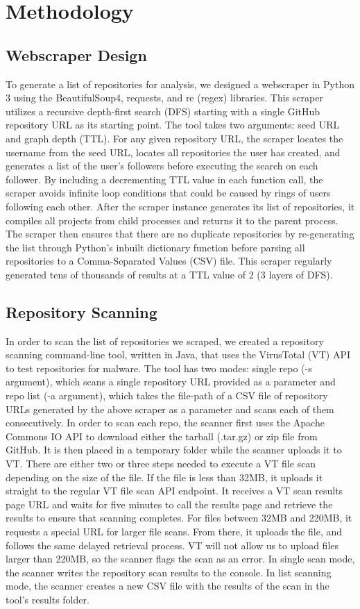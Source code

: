 \documentclass[]{acmart}
\begin{document}
\section{Methodology}
\subsection{Webscraper Design}
To generate a list of repositories for analysis, we designed a webscraper in Python 3 using the BeautifulSoup4, requests, and re (regex) libraries. This scraper utilizes a recursive depth-first search (DFS) starting with a single GitHub repository URL as its starting point. The tool takes two arguments: seed URL and graph depth (TTL). For any given repository URL, the scraper locates the username from the seed URL, locates all repositories the user has created, and generates a list of the user's followers before executing the search on each follower. By including a decrementing TTL value in each function call, the scraper avoids infinite loop conditions that could be caused by rings of users following each other. After the scraper instance generates its list of repositories, it compiles all projects from child processes and returns it to the parent process. The scraper then ensures that there are no duplicate repositories by re-generating the list through Python's inbuilt dictionary function before parsing all repositories to a Comma-Separated Values (CSV) file. This scraper regularly generated tens of thousands of results at a TTL value of 2 (3 layers of DFS).
\subsection{Repository Scanning}
In order to scan the list of repositories we scraped, we created a repository scanning command-line tool, written in Java, that uses the VirusTotal (VT) API to test repositories for malware. The tool has two modes: single repo (-s argument), which scans a single repository URL provided as a parameter and repo list (-a argument), which takes the file-path of a CSV file of repository URLs generated by the above scraper as a parameter and scans each of them consecutively. In order to scan each repo, the scanner first uses the Apache Commons IO API to download either the tarball (.tar.gz) or zip file from GitHub. It is then placed in a temporary folder while the scanner uploads it to VT. There are either two or three steps needed to execute a VT file scan depending on the size of the file. If the file is less than 32MB, it uploads it straight to the regular VT file scan API endpoint. It receives a VT scan results page URL and waits for five minutes to call the results page and retrieve the results to ensure that scanning completes. For files between 32MB and 220MB, it requests a special URL for larger file scans. From there, it uploads the file, and follows the same delayed retrieval process. VT will not allow us to upload files larger than 220MB, so the scanner flags the scan as an error. In single scan mode, the scanner writes the repository scan results to the console. In list scanning mode, the scanner creates a new CSV file with the results of the scan in the tool's results folder.
\end{document}
